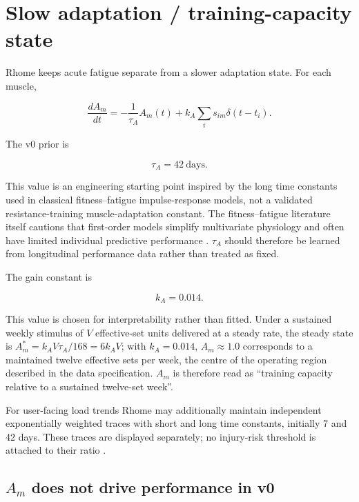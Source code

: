 \documentclass[11pt]{article}
\begin{document}
\section{Slow adaptation / training-capacity state}

Rhome keeps acute fatigue separate from a slower adaptation state. For each muscle,

\begin{equation}
\frac{dA_m}{dt}=-\frac{1}{\tau_A}A_m(t)+k_A\sum_i s_{im}\delta(t-t_i).
\end{equation}

The v0 prior is

\begin{equation}
\tau_A=42\ \mathrm{days}.
\end{equation}

This value is an engineering starting point inspired by the long time constants used in classical fitness--fatigue impulse-response models, not a validated resistance-training muscle-adaptation constant. The fitness--fatigue literature itself cautions that first-order models simplify multivariate physiology and often have limited individual predictive performance \cite{imbach2022}. $\tau_A$ should therefore be learned from longitudinal performance data rather than treated as fixed.

The gain constant is

\begin{equation}
k_A=0.014.
\end{equation}

This value is chosen for interpretability rather than fitted. Under a sustained weekly stimulus of $V$ effective-set units delivered at a steady rate, the steady state is $A_m^{*}=k_AV\tau_A/168=6k_AV$; with $k_A=0.014$, $A_m\approx1.0$ corresponds to a maintained twelve effective sets per week, the centre of the operating region described in the data specification. $A_m$ is therefore read as ``training capacity relative to a sustained twelve-set week''.

For user-facing load trends Rhome may additionally maintain independent exponentially weighted traces with short and long time constants, initially 7 and 42 days. These traces are displayed separately; no injury-risk threshold is attached to their ratio \cite{impellizzeri2020}.

\subsection{$A_m$ does not drive performance in v0}
\end{document}
